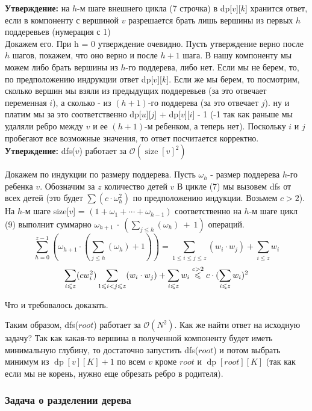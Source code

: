 \documentclass[a4paper,12pt]{article}
\begin{document}
      \textbf{Утверждение:} на $h$-м шаге внешнего цикла (7 строчка) 
      в dp[$v$][$k$] хранится ответ, если в компоненту с вершиной $v$
      разрешается брать лишь вершины из первых $h$ поддеревьев (нумерация с 1)
      \\
      
      Докажем его. При h = 0 утверждение очевидно. Пусть утверждение верно 
      после $h$ шагов, покажем, что оно верно и после $h + 1$ шага. В нашу 
      компоненту мы можем либо брать вершины из $h$-го поддерева, либо нет. 
      Если мы не берем, то, по предположению индрукции ответ dp[$v$][$k$]. 
      Если же мы берем, то посмотрим, сколько вершин мы взяли из предыдущих 
      поддеревьев (за это отвечает переменная $i$), а сколько - из 
      $(h + 1)$-го поддерева (за это отвечает $j$). ну и платим мы за это 
      соответственно dp[$u$][$j$] + dp[$v$][$i$] - 1 (-1 так как раньше мы 
      удаляли ребро между $v$ и ее $(h + 1)$-м ребенком, а теперь нет). 
      Поскольку $i$ и $j$ пробегают все возможные значения, то ответ 
      посчитается корректно. 
	  \\
	  
      \textbf{Утверждение:} dfs($v$) работает за 
      $\mathcal{O}(\operatorname{size}[v]^2)$ 

      Докажем по индукции по размеру поддерева. Пусть $\omega_h$ - 
      размер поддерева $h$-го ребенка $v$. Обозначим за $z$ количество 
      детей $v$ В цикле (7) мы вызовем dfs от всех детей (это 
      будет $\sum(c \cdot \omega_h^2)$ по предположению индукции. 
      Возьмем $c > 2$). На $h$-м шаге size[$v$] = 
       $(1 + \omega_1 + \cdots + \omega_{h - 1})$ соответственно на 
       $h$-м шаге цикл (9) выполнит суммарно 
       $\omega_{h + 1}~\cdot~(\sum\limits_{j \leqslant h}(\omega_h)~+~1)$ 
       операций. $$\sum\limits_{h = 0}^{z - 1}(\omega_{h + 1} \cdot 
       (\sum\limits_{j \leqslant h}(\omega_h) + 1)) = \sum\limits_{1 \leqslant i 
       \leqslant j \leqslant z}(w_i \cdot w_j) + \sum_{i \leqslant z}w_i $$
       $$\sum_{i \leqslant z} (c w_i^2) \sum\limits_{1 \leqslant i < j 
       \leqslant z}(w_i \cdot w_j) + \sum_{i \leqslant z}w_i \buildrel 
       c > 2 \over \leqslant c \cdot (\sum\limits_{i \leqslant z} 
       w_i) ^ 2$$

       Что и требовалось доказать.
       
       Таким образом, dfs($root$) работает за $\mathcal{O}(N^2)$. 
       Как же найти ответ на исходную задачу? Так как какая-то вершина в 
       полученной компоненту будет иметь минимальную глубину, то достаточно 
       запустить dfs($root$) и потом выбрать минимум из 
       $\operatorname{dp}[v][K] + 1$ по всем $v$ кроме $root$ и 
       $\operatorname{dp}[root][K]$ (так как если мы не корень, нужно еще 
       обрезать ребро в родителя).

      \subsubsection{Задача о разделении дерева}
\end{document}
